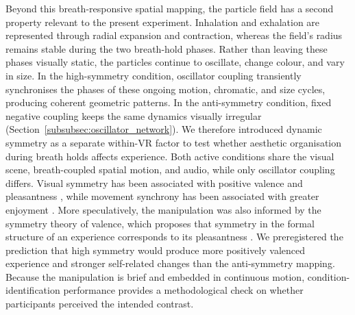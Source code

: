 \documentclass[pdflatex,sn-basic,lineno]{sn-jnl}
\begin{document}
Beyond this breath-responsive spatial mapping, the particle field has a second property relevant to the present experiment. Inhalation and exhalation are represented through radial expansion and contraction, whereas the field's radius remains stable during the two breath-hold phases. Rather than leaving these phases visually static, the particles continue to oscillate, change colour, and vary in size. In the high-symmetry condition, oscillator coupling transiently synchronises the phases of these ongoing motion, chromatic, and size cycles, producing coherent geometric patterns. In the anti-symmetry condition, fixed negative coupling keeps the same dynamics visually irregular (Section~\ref{subsubsec:oscillator_network}). We therefore introduced dynamic symmetry as a separate within-VR factor to test whether aesthetic organisation during breath holds affects experience. Both active conditions share the visual scene, breath-coupled spatial motion, and audio, while only oscillator coupling differs. Visual symmetry has been associated with positive valence \citep{Bertamini2013, Makin2012} and pleasantness \citep{Pecchinenda2014}, while movement synchrony has been associated with greater enjoyment \citep{Vicary2017}. More speculatively, the manipulation was also informed by the symmetry theory of valence, which proposes that symmetry in the formal structure of an experience corresponds to its pleasantness \citep{Johnson2023}. We preregistered the prediction that high symmetry would produce more positively valenced experience and stronger self-related changes than the anti-symmetry mapping. Because the manipulation is brief and embedded in continuous motion, condition-identification performance provides a methodological check on whether participants perceived the intended contrast.
\end{document}
